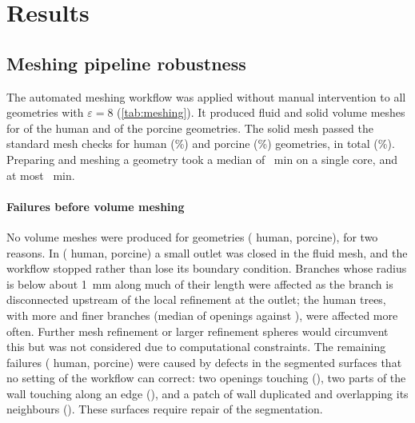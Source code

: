 \section{Results}\label{sec:results}
\subsection{Meshing pipeline robustness}\label{sec:res-pipeline}


The automated meshing workflow was applied without manual intervention to all \MeshGeometriesAll{} geometries with $\varepsilon = 8$ (\cref{tab:meshing}).
It produced fluid and solid volume meshes for \MeshMeshedHuman{} of the \MeshGeometriesHuman{} human and \MeshMeshedPorcine{} of the \MeshGeometriesPorcine{} porcine geometries.
The solid mesh passed the standard \OpenFOAM{} mesh checks for \MeshCleanHuman{} human (\MeshCleanPctHuman\%) and \MeshCleanPorcine{} porcine (\MeshCleanPctPorcine\%) geometries, \MeshCleanAll{} in total (\MeshCleanPctAll\%).
Preparing and meshing a geometry took a median of \MeshRuntimeMedianMin~min on a single core, and at most \MeshRuntimeMaxMin~min.

\paragraph{Failures before volume meshing}
No volume meshes were produced for \MeshFailedAll{} geometries (\MeshFailedHuman{} human, \MeshFailedPorcine{} porcine), for two reasons.
In \MeshOutletClosedAll{} (\MeshOutletClosedHuman{} human, \MeshOutletClosedPorcine{} porcine) a small outlet was closed in the fluid mesh, and the workflow stopped rather than lose its boundary condition.
Branches whose radius is below about \SI{1}{\milli\metre} along much of their length were affected as the branch is disconnected upstream of the local refinement at the outlet; the human trees, with more and finer branches (median of \MeshOpeningsMedianHuman{} openings against \MeshOpeningsMedianPorcine{}), were affected more often.
Further mesh refinement or larger refinement spheres would circumvent this but was not considered due to computational constraints.
The remaining \MeshScanDefectsAll{} failures (\MeshScanDefectsHuman{} human, \MeshScanDefectsPorcine{} porcine) were caused by defects in the segmented surfaces that no setting of the workflow can correct: two openings touching (\MeshTouchingOpeningsAll), two parts of the wall touching along an edge (\MeshNonManifoldWallAll), and a patch of wall duplicated and overlapping its neighbours (\MeshDuplicatedPatchAll).
These surfaces require repair of the segmentation.

